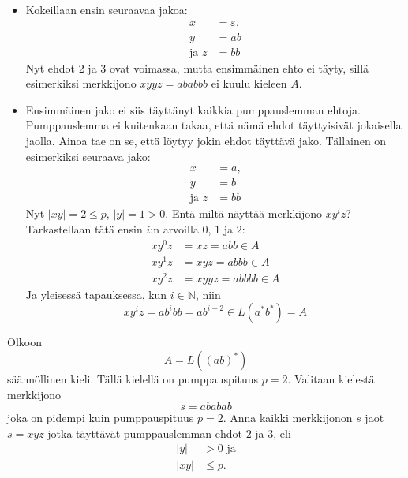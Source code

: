 \documentclass[a4paper,11pt]{article}
\theoremstyle{definition}
\newcommand{\Nat}{\mathbb{N}}
\begin{document}
\begin{itemize}
    \item Kokeillaan ensin seuraavaa jakoa:
        \begin{align*}
            x            & = \varepsilon \text{,}  \\
            y            & = ab            \\
            \text{ja } z & = bb
        \end{align*}
        Nyt ehdot 2 ja 3 ovat voimassa, mutta ensimmäinen ehto ei täyty, sillä
        esimerkiksi merkkijono $xyyz = ababbb$ ei kuulu kieleen $A$.

    \item Ensimmäinen jako ei siis täyttänyt kaikkia pumppauslemman ehtoja.
        Pumppauslemma ei kuitenkaan takaa, että nämä ehdot täyttyisivät
        jokaisella jaolla. Ainoa tae on se, että löytyy jokin ehdot täyttävä
        jako. Tällainen on esimerkiksi seuraava jako:
        \begin{align*}
            x              & = a \textrm{,} \\
            y              & = b \\
            \textrm{ja } z & = bb
        \end{align*}
        Nyt $|xy| = 2 \leq p$, $|y| = 1 > 0$. Entä miltä näyttää merkkijono
        $xy^iz$? Tarkastellaan tätä ensin $i$:n arvoilla $0$, $1$ ja $2$:
        \begin{align*}
            xy^0z & = xz  = abb \in A \\
            xy^1z & = xyz = abbb \in A \\
            xy^2z & = xyyz = abbbb \in A
        \end{align*}
        Ja yleisessä tapauksessa, kun $i \in \Nat$, niin
        \begin{equation*}
            xy^iz = ab^ibb = ab^{i+2} \in L(a^*b^*) = A
        \end{equation*}
\end{itemize}

\begin{exercise}
    Olkoon
    \begin{equation*}
        A = L((ab)^*)
    \end{equation*}
    säännöllinen kieli. Tällä kielellä on pumppauspituus $p = 2$. Valitaan
    kielestä merkkijono
    \begin{equation*}
        s = ababab
    \end{equation*}
    joka on pidempi kuin pumppauspituus $p = 2$.  Anna kaikki merkkijonon $s$
    jaot $s = xyz$ jotka täyttävät pumppauslemman ehdot $2$ ja $3$, eli 
    \begin{align*}
        |y|  & > 0 \textrm{ ja} \\
        |xy| & \leq p \text{.}
    \end{align*}
\end{exercise}
\end{document}
